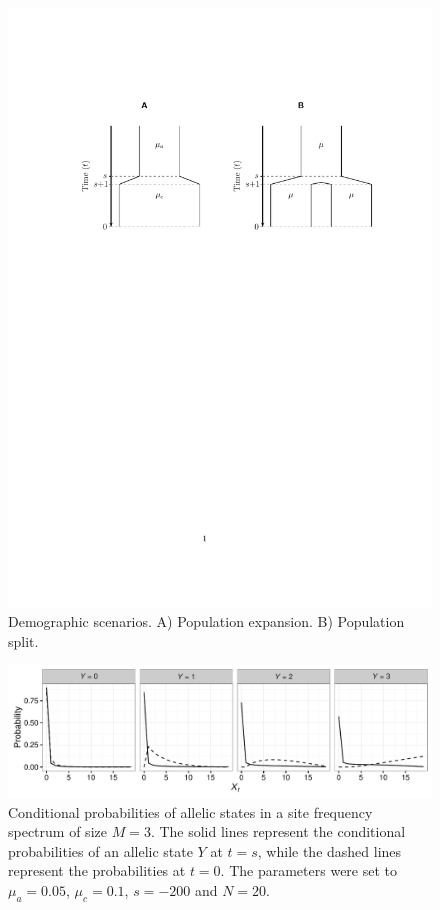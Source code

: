 \documentclass[preprint]{elsarticle}
\newcommand\y{\ensuremath{Y}}
\begin{document}
\begin{figure}[ht]
\includegraphics[width = 12cm]{diags.pdf}
\caption{Demographic scenarios. A) Population expansion. B) Population split.}\label{diag}
\end{figure}

\begin{figure}[ht]
\includegraphics[width = 12cm]{cProb.pdf}
\caption{Conditional probabilities of allelic states in a site frequency spectrum of size $M=3$. The solid lines represent the conditional probabilities of an allelic state $\y$ at $t=s$, while the dashed lines represent the probabilities at $t=0$. The parameters were set to $\mu_a=0.05$, $\mu_c=0.1$, $s=-200$ and $N=20$.}\label{cProb}
\end{figure}
\end{document}
